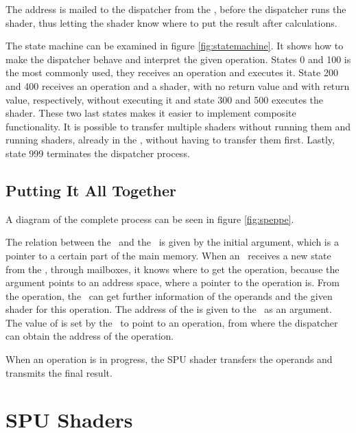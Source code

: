 The  address is mailed to the dispatcher from
the \PPE{}, before the dispatcher runs the shader, thus letting the
shader know where to put the result after calculations.

The state machine can be examined in figure \ref{fig:statemachine}. It
shows how to make the dispatcher behave and interpret the given
operation. States 0 and 100 is the most commonly used, they receives
an operation and executes it. State 200 and 400 receives an operation
and a shader, with no return value and with return value,
respectively, without executing it and state 300 and 500 executes the
shader. These two last states makes it easier to implement composite
functionality. It is possible to transfer multiple shaders without
running them and running shaders, already in the \LS{}, without having
to transfer them first. Lastly, state 999 terminates the dispatcher
process.


\subsection{Putting It All Together}

A diagram of the complete process can be seen in figure
\ref{fig:speppe}.

The relation between the \PPE\ and the \SPE\ is given by the initial
argument, which is a pointer to a certain part of the main
memory. When an \SPE\ receives a new state from the \PPE{}, through
mailboxes, it knows where to get the operation, because the argument
points to an address space, where a pointer to the operation is. From
the operation, the \SPE\ can get further information of the operands
and the given shader for this operation. The address of the
 is given to the \SPE\ as an
argument. The value of  is set by the
\PPE\ to point to an operation, from where the dispatcher can obtain
the address of the operation.

When an operation is in progress, the SPU shader transfers the
operands and transmits the final result.


\section{SPU Shaders}

